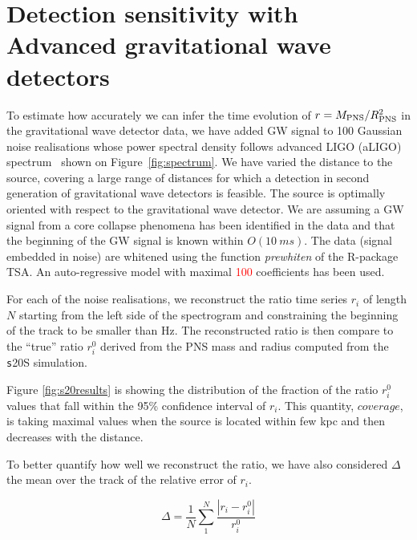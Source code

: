 \section{Detection sensitivity with Advanced gravitational wave detectors}
\label{sec:results}

To estimate how accurately we can infer the time evolution of $r=M_{\rm PNS}/R_{\rm PNS}^2$ in the
gravitational wave detector data, we have added  GW signal  to 
100 Gaussian noise realisations whose power spectral density follows  advanced LIGO (aLIGO)
spectrum~\cite{aLIGOsens:2018} shown on Figure~\ref{fig:spectrum}. 
We have varied the distance to the source, covering a large
range of distances for which a detection in second generation of gravitational wave detectors
is feasible. The source is optimally oriented with
respect to the gravitational wave detector. We are assuming a GW signal from a core collapse
phenomena has been identified in the data and that the beginning of the GW signal is known within $O(10~ms)$.
The data (signal embedded in noise) are whitened using the function {\it prewhiten} of the R-package TSA.
An auto-regressive model with maximal \textcolor{red}{100} coefficients has been used.    

For each of the noise realisations, we reconstruct the ratio time series {$r_i$}
of length $N$ starting from the left side of the spectrogram and constraining the beginning of the
track to be smaller than \unit[200]{Hz}. The reconstructed ratio is then compare to the ``true'' ratio
{$r_i^0$} derived from the PNS mass and radius computed from the {\texttt s20S} simulation.

Figure \ref{fig:s20results} is showing the distribution of the fraction of the ratio {$r_i^0$} values that fall
within the 95\% confidence interval of {$r_i$}. This quantity, $coverage$, is taking maximal values
when the source is located within few kpc and then decreases with the distance.

To better quantify how well we reconstruct the ratio, we have also considered $\Delta$ the mean
over the track of the relative error of $r_i$. 

\begin{equation}
\Delta=\frac{1}{N}\sum_1^N\frac{|r_i-r_i^0|}{r_i^0}
\end{equation}

